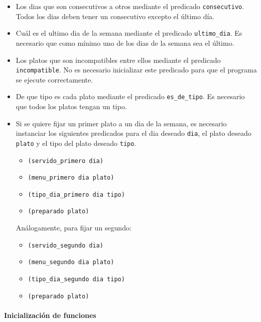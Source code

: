 \begin{itemize}
  \item 
    Los dias que son consecutivos a otros 
    mediante el predicado \texttt{consecutivo}.
    Todos los dias deben tener un consecutivo excepto el último día.
  \item 
    Cuál es el ultimo dia de la semana
    mediante el predicado \texttt{ultimo\_dia}.
    Es necesario que como mínimo uno de los dias de la semana sea el último.
  \item 
    Los platos que son incompatibles entre ellos
    mediante el predicado \texttt{incompatible}.
    No es necesario inicializar este predicado para que el programa se
    ejecute correctamente.
  \item 
    De que tipo es cada plato
    mediante el predicado \texttt{es\_de\_tipo}.
    Es necesario que todos los platos tengan un tipo.
  \item
    Si se quiere fijar un primer plato a un dia de la semana, es necesario
    instanciar los siguientes predicados para el dia deseado \texttt{dia},
    el plato deseado \texttt{plato} y el tipo del plato deseado
    \texttt{tipo}.

    \begin{itemize}
      \item \texttt{(servido\_primero dia)}
      \item \texttt{(menu\_primero dia plato)}
      \item \texttt{(tipo\_dia\_primero dia tipo)}
      \item \texttt{(preparado plato)}
    \end{itemize}

    Análogamente, para fijar un segundo:

    \begin{itemize}
      \item \texttt{(servido\_segundo dia)}
      \item \texttt{(menu\_segundo dia plato)}
      \item \texttt{(tipo\_dia\_segundo dia tipo)}
      \item \texttt{(preparado plato)}
    \end{itemize}

\end{itemize}

\paragraph{Inicialización de funciones}

